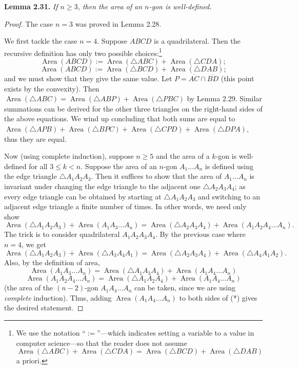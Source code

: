 \documentclass[leqno]{book}
\begin{document}
\noindent\textbf{Lemma 2.31.} \emph{If $n\geqslant 3$, then the area of an $n$-gon is well-defined.}
\begin{proof}
The case $n=3$ was proved in Lemma 2.28.

We first tackle the case $n=4$.  Suppose $ABCD$ is a quadrilateral.  Then the recursive definition has only two possible choices:\footnote{We use the notation ``$:=$''\----which indicates setting a variable to a value in computer science\----so that the reader does not assume $\operatorname{Area}(\triangle ABC)+\operatorname{Area}(\triangle CDA)=\operatorname{Area}(\triangle BCD)+\operatorname{Area}(\triangle DAB)$ a priori.}
$$\operatorname{Area}(ABCD):=\operatorname{Area}(\triangle ABC)+\operatorname{Area}(\triangle CDA);$$
$$\operatorname{Area}(ABCD):=\operatorname{Area}(\triangle BCD)+\operatorname{Area}(\triangle DAB);$$
and we must show that they give the same value.  Let $P=\overline{AC}\cap\overline{BD}$ (this point exists by the convexity).  Then $\operatorname{Area}(\triangle ABC)=\operatorname{Area}(\triangle ABP)+\operatorname{Area}(\triangle PBC)$ by Lemma 2.29.  Similar summations can be derived for the other three triangles on the right-hand sides of the above equations.  We wind up concluding that both sums are equal to $\operatorname{Area}(\triangle APB)+\operatorname{Area}(\triangle BPC)+\operatorname{Area}(\triangle CPD)+\operatorname{Area}(\triangle DPA)$, thus they are equal.

Now (using complete induction), suppose $n\geqslant 5$ and the area of a $k$-gon is well-defined for all $3\leqslant k<n$.  Suppose the area of an $n$-gon $A_1\dots A_n$ is defined using the edge triangle $\triangle A_1A_2A_3$.  Then it suffices to show that the area of $A_1\dots A_n$ is invariant under changing the edge triangle to the adjacent one $\triangle A_2A_3A_4$; as every edge triangle can be obtained by starting at $\triangle A_1A_2A_3$ and switching to an adjacent edge triangle a finite number of times.  In other words, we need only show
$$\operatorname{Area}(\triangle A_1A_2A_3)+\operatorname{Area}(A_1A_3\dots A_n)=\operatorname{Area}(\triangle A_2A_3A_4)+\operatorname{Area}(A_1A_2A_4\dots A_n).$$
The trick is to consider quadrilateral $A_1A_2A_3A_4$.  By the previous case where $n=4$, we get
\begin{equation}\tag{*}
\operatorname{Area}(\triangle A_1A_2A_3)+\operatorname{Area}(\triangle A_3A_4A_1)=\operatorname{Area}(\triangle A_2A_3A_4)+\operatorname{Area}(\triangle A_4A_1A_2).
\end{equation}
Also, by the definition of area,
$$\operatorname{Area}(A_1A_3\dots A_n)=\operatorname{Area}(\triangle A_1A_3A_4)+\operatorname{Area}(A_1A_4\dots A_n)$$
$$\operatorname{Area}(A_1A_2A_4\dots A_n)=\operatorname{Area}(\triangle A_1A_2A_4)+\operatorname{Area}(A_1A_4\dots A_n)$$
(the area of the $(n-2)$-gon $A_1A_4\dots A_n$ can be taken, since we are using \emph{complete} induction).  Thus, adding $\operatorname{Area}(A_1A_4\dots A_n)$ to both sides of (*) gives the desired statement.
\end{proof}
\end{document}
